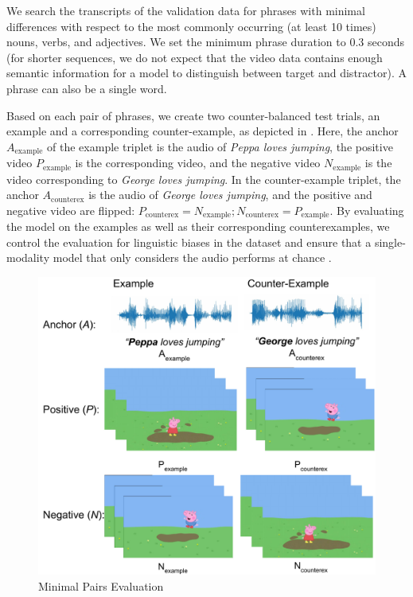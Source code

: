We search the transcripts of the validation data for phrases with
minimal differences with respect to the most commonly occurring (at least 10 
times) nouns, verbs, and adjectives. We set the minimum phrase duration to 0.3 
seconds (for shorter sequences, we do not expect that the video data contains 
enough semantic information for a model to distinguish between target and 
distractor). A phrase can also be a single word.


Based on each pair of phrases, we create two counter-balanced test trials, an 
example and a corresponding counter-example, as depicted in
. Here, 
the anchor $A_{\text{example}}$ of the example
triplet is the audio of \textit{Peppa loves jumping}, the
positive video $P_{\text{example}}$ is the corresponding video, and the
negative video $N_{\text{example}}$ is the video corresponding to \textit{George
  loves jumping}. In the
counter-example triplet, the anchor $A_{\text{counterex}}$ is the audio of
\textit{George loves jumping}, and the positive and negative video are
flipped: $P_{\text{counterex}} = N_{\text{example}}; N_{\text{counterex}} = P_{\text{example}}$. By 
evaluating the model on the examples as well as their corresponding 
counterexamples, we control the evaluation for linguistic biases in the dataset 
and ensure that a single-modality model that only considers the audio performs 
at chance \citep[see also][]{nikolaus-fourtassi-2021-evaluating}.

\begin{figure}[ht]
  \centering
  \includegraphics[width=\columnwidth]{peppa_targeted_triplets.pdf}
  \caption{Minimal Pairs Evaluation}
  \label{fig:minimal_pairs}
\end{figure}

